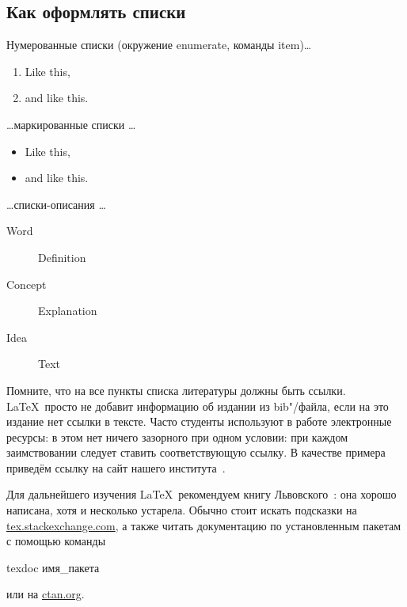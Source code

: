 \subsection{Как оформлять списки}

Нумерованные списки (окружение enumerate, команды item)…

\begin{enumerate}
  \item Like this,
  \item and like this.
\end{enumerate}

\dots маркированные списки \dots

\begin{itemize}
  \item Like this,
  \item and like this.
\end{itemize}

\dots списки-описания \dots

\begin{description}
  \item[Word] Definition
  \item[Concept] Explanation
  \item[Idea] Text
\end{description}

\Conc

Помните, что на все пункты списка литературы должны быть ссылки. \LaTeX\ просто не добавит информацию об издании из bib"/файла, если на это издание нет ссылки в тексте. Часто студенты используют в работе  электронные ресурсы: в этом нет ничего зазорного при одном условии: при каждом заимствовании следует ставить соответствующую ссылку. В качестве примера приведём ссылку на сайт нашего института~\autocite{mmcs}.

Для дальнейшего изучения \LaTeX\ рекомендуем книгу Львовского~\autocite{Lvo2003}: она хорошо написана, хотя и несколько устарела.
Обычно стоит искать подсказки на
\href{http://tex.stackexchange.com/}{tex.stackexchange.com}, а также
читать документацию по установленным пакетам с помощью
команды
\begin{Verb}
texdoc имя_пакета
\end{Verb}
или на \href{http://ctan.org/}{ctan.org}.

\printbibliography[%
    heading=bibintoc%
]


